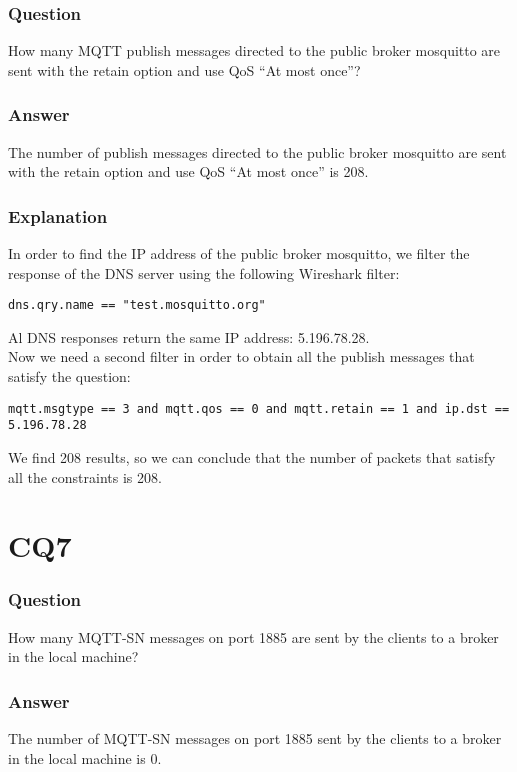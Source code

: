 \subsubsection{Question}
How many MQTT publish messages directed to the public broker mosquitto are sent with the retain option and use QoS “At most once”?

\subsubsection{Answer}
The number of publish messages directed to the public broker mosquitto are sent with the retain option and use QoS “At most once” is 208.

\subsubsection{Explanation}
In order to find the IP address of the public broker mosquitto, we filter the response of the DNS server using the following Wireshark filter:
\begin{verbatim}
dns.qry.name == "test.mosquitto.org"
\end{verbatim}
Al DNS responses return the same IP address: 5.196.78.28.\\
Now we need a second filter in order to obtain all the publish messages that satisfy the question:
\begin{verbatim}
mqtt.msgtype == 3 and mqtt.qos == 0 and mqtt.retain == 1 and ip.dst == 5.196.78.28
\end{verbatim}
We find 208 results, so we can conclude that the number of packets that satisfy all the constraints is 208.

\section{CQ7}
\subsubsection{Question}
How many MQTT-SN messages on port 1885 are sent by the clients to a broker in the local machine?

\subsubsection{Answer}
The number of MQTT-SN messages on port 1885 sent by the clients to a broker in the local machine is 0.

